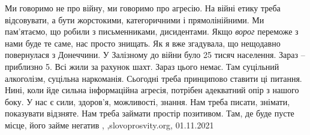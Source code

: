 Ми говоримо не про війну, ми говоримо про агресію. На війні етику треба
відсовувати, а бути жорстокими, категоричними і прямолінійними. Ми пам’ятаємо,
що робили з письменниками, дисидентами. Якщо \emph{ворог} переможе з нами буде те
саме, нас просто знищать.  Як я вже згадувала, що нещодавно повернулася з
Донеччини. У Залізному до війни було 25 тисяч населення. Зараз – приблизно 5.
Всі жили за рахунок шахт. Зараз цього немає. Там суцільний алкоголізм, суцільна
наркоманія. Сьогодні треба принципово ставити ці питання. Нині, коли йде сильна
інформаційна агресія, потрібен адекватний опір з нашого боку.  У нас є сили,
здоров’я, можливості, знання. Нам треба писати, знімати, показувати відзняте.
Нам треба займати простір позитивом. Там, де буде пусте місце, його займе
негатив
, ,slovoprosvity.org, 01.11.2021

